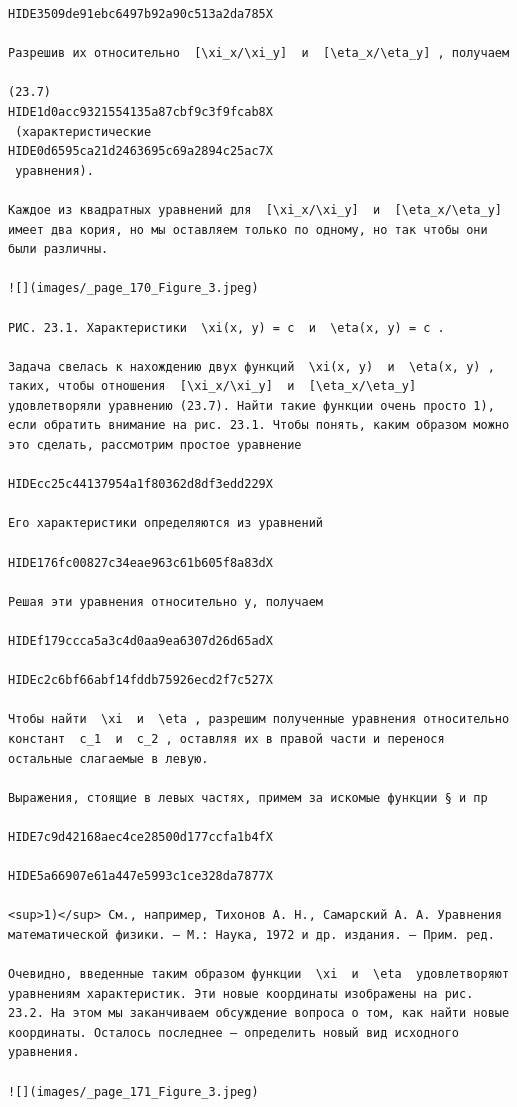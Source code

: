 \documentclass[
  ukrainian,
]{article}
\begin{document}
\begin{verbatim}
HIDE3509de91ebc6497b92a90c513a2da785X

Разрешив их относительно  [\xi_x/\xi_y]  и  [\eta_x/\eta_y] , получаем

(23.7) 
HIDE1d0acc9321554135a87cbf9c3f9fcab8X
 (характеристические 
HIDE0d6595ca21d2463695c69a2894c25ac7X
 уравнения).

Kaждое из квадратных уравнений для  [\xi_x/\xi_y]  и  [\eta_x/\eta_y]  имеет два кория, но мы оставляем только по одному, но так чтобы они были различны.

![](images/_page_170_Figure_3.jpeg)

РИС. 23.1. Характеристики  \xi(x, y) = c  и  \eta(x, y) = c .

Задача свелась к нахождению двух функций  \xi(x, y)  и  \eta(x, y) , таких, чтобы отношения  [\xi_x/\xi_y]  и  [\eta_x/\eta_y]  удовлетворяли уравнению (23.7). Найти такие функции очень просто 1), если обратить внимание на рис. 23.1. Чтобы понять, каким образом можно это сделать, рассмотрим простое уравнение

HIDEcc25c44137954a1f80362d8df3edd229X

Его характеристики определяются из уравнений

HIDE176fc00827c34eae963c61b605f8a83dX

Решая эти уравнения относительно у, получаем

HIDEf179ccca5a3c4d0aa9ea6307d26d65adX

HIDEc2c6bf66abf14fddb75926ecd2f7c527X

Чтобы найти  \xi  и  \eta , разрешим полученные уравнения относительно констант  c_1  и  c_2 , оставляя их в правой части и перенося остальные слагаемые в левую.

Выражения, стоящие в левых частях, примем за искомые функции § и пр

HIDE7c9d42168aec4ce28500d177ccfa1b4fX

HIDE5a66907e61a447e5993c1ce328da7877X

<sup>1)</sup> См., например, Тихонов А. Н., Самарский А. А. Уравнения математической физики. — М.: Наука, 1972 и др. издания. — Прим. ред.

Очевидно, введенные таким образом функции  \xi  и  \eta  удовлетворяют уравнениям характеристик. Эти новые координаты изображены на рис. 23.2. На этом мы заканчиваем обсуждение вопроса о том, как найти новые координаты. Осталось последнее — определить новый вид исходного уравнения.

![](images/_page_171_Figure_3.jpeg)


\end{verbatim}
\end{document}
